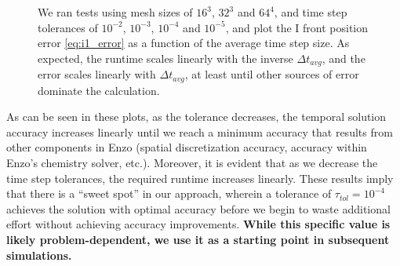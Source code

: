 \begin{figure}[t]
{  \hfill}
  \caption{We ran tests using mesh sizes of
    $16^3$, $32^3$ and $64^4$, and time step tolerances of
    $10^{-2}$, $10^{-3}$, $10^{-4}$ and $10^{-5}$, and plot the I
    front position error \eqref{eq:i1_error} as a function of the
    average time step size.  As expected, the runtime scales linearly
    with the inverse $\Delta t_{avg}$, and the error scales linearly
    with $\Delta t_{avg}$, at least until other sources of error
    dominate the calculation.}
  \label{fig:i1_stats}
\end{figure}
As can be seen in these plots, as the tolerance decreases, the
temporal solution accuracy increases linearly until we reach a minimum
accuracy that results from other components in Enzo (spatial
discretization accuracy, accuracy within Enzo's chemistry solver,
etc.).  Moreover, it is evident that as we decrease the time step
tolerances, the required runtime increases linearly.  These results
imply that there is a ``sweet spot'' in our approach, wherein a
tolerance of $\tau_{tol}=10^{-4}$ achieves the solution with optimal
accuracy before we begin to waste additional effort without achieving
accuracy improvements.  {\bf While this specific value is likely
problem-dependent, we use it as a starting point in subsequent
simulations. }

